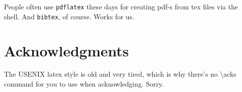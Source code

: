 People often use \texttt{pdflatex} these days for creating pdf-s from
tex files via the shell. And \texttt{bibtex}, of course. Works for us.

\section*{Acknowledgments}

The USENIX latex style is old and very tired, which is why
there's no \textbackslash{}acks command for you to use when
acknowledging. Sorry.







